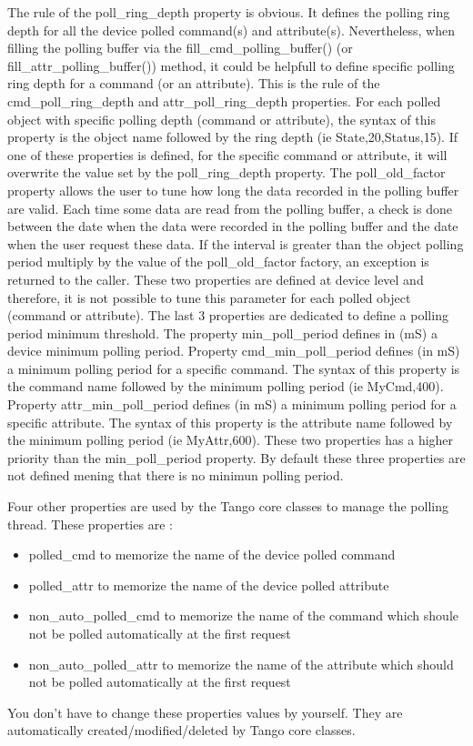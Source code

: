 The rule of the poll\_ring\_depth property
is obvious. It defines the polling ring depth for all the device polled
command(s) and attribute(s). Nevertheless, when filling the polling
buffer via the fill\_cmd\_polling\_buffer()
(or fill\_attr\_polling\_buffer())
method, it could be helpfull to define specific polling ring depth
for a command (or an attribute). This is the rule of the cmd\_poll\_ring\_depth
and attr\_poll\_ring\_depth properties.
For each polled object with specific polling depth (command or attribute),
the syntax of this property is the object name followed by the ring
depth (ie State,20,Status,15). If one of these properties is defined,
for the specific command or attribute, it will overwrite the value
set by the poll\_ring\_depth property. The poll\_old\_factor
property allows the user to tune how long the data recorded in the
polling buffer are valid. Each time some data are read from the polling
buffer, a check is done between the date when the data were recorded
in the polling buffer and the date when the user request these data.
If the interval is greater than the object polling period multiply
by the value of the poll\_old\_factor factory, an exception is returned
to the caller. These two properties are defined at device level and
therefore, it is not possible to tune this parameter for each polled
object (command or attribute). The last 3 properties are dedicated
to define a polling period minimum threshold. The property min\_poll\_period
defines in (mS) a device minimum polling period. Property cmd\_min\_poll\_period
defines (in mS) a minimum polling period for a specific command. The
syntax of this property is the command name followed by the minimum
polling period (ie MyCmd,400). Property attr\_min\_poll\_period
defines (in mS) a minimum polling period for a specific attribute.
The syntax of this property is the attribute name followed by the
minimum polling period (ie MyAttr,600). These two properties has a
higher priority than the min\_poll\_period property. By default these
three properties are not defined mening that there is no minimun polling
period.

Four other properties are used by the Tango core classes to manage
the polling thread. These properties are :
\begin{itemize}
\item polled\_cmd to memorize the name of the device polled command
\item polled\_attr to memorize the name of the device polled attribute
\item non\_auto\_polled\_cmd to memorize the name of the command which shoule
not be polled automatically at the first request
\item non\_auto\_polled\_attr to memorize the name of the attribute which
should not be polled automatically at the first request
\end{itemize}
You don't have to change these properties values by yourself. They
are automatically created/modified/deleted by Tango core classes.


